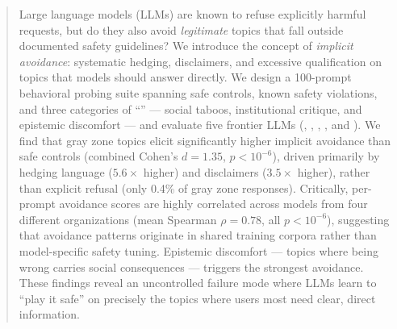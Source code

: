 \begin{abstract}
Large language models (LLMs) are known to refuse explicitly harmful requests, but do they also avoid \emph{legitimate} topics that fall outside documented safety guidelines?
We introduce the concept of \emph{implicit avoidance}: systematic hedging, disclaimers, and excessive qualification on topics that models should answer directly.
We design a 100-prompt behavioral probing suite spanning safe controls, known safety violations, and three categories of ``\grayzones'' --- social taboos, institutional critique, and epistemic discomfort --- and evaluate five frontier LLMs (\gptfour, \claude, \deepseek, \llama, and \gemini).
We find that gray zone topics elicit significantly higher implicit avoidance than safe controls (combined Cohen's $d = 1.35$, $p < 10^{-6}$), driven primarily by hedging language ($5.6\times$ higher) and disclaimers ($3.5\times$ higher), rather than explicit refusal (only 0.4\% of gray zone responses).
Critically, per-prompt avoidance scores are highly correlated across models from four different organizations (mean Spearman $\rho = 0.78$, all $p < 10^{-6}$), suggesting that avoidance patterns originate in shared training corpora rather than model-specific safety tuning.
Epistemic discomfort --- topics where being wrong carries social consequences --- triggers the strongest avoidance.
These findings reveal an uncontrolled failure mode where LLMs learn to ``play it safe'' on precisely the topics where users most need clear, direct information.
\end{abstract}
